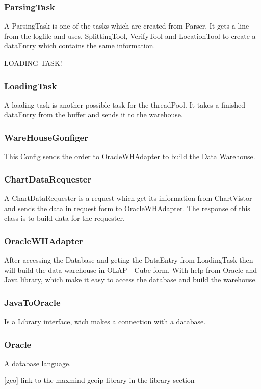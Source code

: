 \subsubsection*{ParsingTask}
A ParsingTask is one of the tasks which are created from Parser. It gets a line from the logfile and uses, SplittingTool, VerifyTool
and LocationTool to create a dataEntry which contains the same information. 

LOADING TASK! %

\subsubsection*{LoadingTask}
A loading task is another possible task for the threadPool. It takes a finished dataEntry from the buffer and sends it to the warehouse.

\subsubsection*{WareHouseGonfiger}

This Config sends the order to OracleWHAdapter to build the Data Warehouse.

\subsubsection*{ChartDataRequester}

A ChartDataRequester is a request which get its information from ChartVistor
and sends the data in request form to OracleWHAdapter. %
The response of this class is to build data for the requester.

\subsubsection*{OracleWHAdapter}

After accessing the Database and geting the DataEntry from LoadingTask then will build %
the data warehouse in OLAP - Cube form. With help from Oracle %
and Java library, which make it easy to access the database and build the warehouse. %

\subsubsection*{JavaToOracle}

Is a Library interface, wich makes a connection with a database.

\subsubsection*{Oracle}

A database language. %


[geo] link to the maxmind geoip library in the library section
